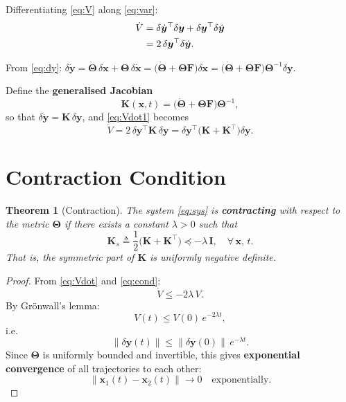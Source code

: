 \documentclass[11pt,a4paper]{article}
\newtheorem{theorem}{Theorem}
\begin{document}
Differentiating \eqref{eq:V} along \eqref{eq:var}:
\begin{align}
  \dot V
  &= \delta\dot{\bm{y}}^\top\delta\bm{y}
   + \delta\bm{y}^\top\delta\dot{\bm{y}} \notag\\
  &= 2\,\delta\bm{y}^\top\delta\dot{\bm{y}}. \label{eq:Vdot1}
\end{align}

From \eqref{eq:dy}: $\delta\dot{\bm{y}} = \dot{\bm{\Theta}}\,\delta\bm{x}
+ \bm{\Theta}\,\delta\dot{\bm{x}}
= \bigl(\dot{\bm{\Theta}} + \bm{\Theta}\bm{F}\bigr)\delta\bm{x}
= \bigl(\dot{\bm{\Theta}} + \bm{\Theta}\bm{F}\bigr)\bm{\Theta}^{-1}\delta\bm{y}.$

Define the \textbf{generalised Jacobian}
\begin{equation}
  \bm{K}(\bm{x},t)
  = \bigl(\dot{\bm{\Theta}} + \bm{\Theta}\bm{F}\bigr)\bm{\Theta}^{-1},
  \label{eq:K}
\end{equation}
so that $\delta\dot{\bm{y}} = \bm{K}\,\delta\bm{y}$, and \eqref{eq:Vdot1}
becomes
\begin{equation}
  \boxed{
  \dot V = 2\,\delta\bm{y}^\top \bm{K}\,\delta\bm{y}
         = \delta\bm{y}^\top\bigl(\bm{K} + \bm{K}^\top\bigr)\delta\bm{y}.
  }
  \label{eq:Vdot}
\end{equation}

\section{Contraction Condition}

\begin{theorem}[Contraction]
The system \eqref{eq:sys} is \textbf{contracting} with respect to the metric
$\bm{\Theta}$ if there exists a constant $\lambda > 0$ such that
\begin{equation}
  \bm{K}_s \triangleq \frac{1}{2}\bigl(\bm{K} + \bm{K}^\top\bigr)
  \preceq -\lambda\,\bm{I}, \quad \forall\,\bm{x},\,t.
  \label{eq:cond}
\end{equation}
That is, the \emph{symmetric part} of $\bm{K}$ is uniformly negative definite.
\end{theorem}

\begin{proof}
From \eqref{eq:Vdot} and \eqref{eq:cond}:
\[
  \dot V \leq -2\lambda\,V.
\]
By Gr\"{o}nwall's lemma:
\[
  V(t) \leq V(0)\,e^{-2\lambda t},
\]
i.e.\
\begin{equation}
  \|\delta\bm{y}(t)\| \leq \|\delta\bm{y}(0)\|\,e^{-\lambda t}.
\end{equation}
Since $\bm{\Theta}$ is uniformly bounded and invertible, this gives
\textbf{exponential convergence} of all trajectories to each other:
\[
  \|\bm{x}_1(t) - \bm{x}_2(t)\| \to 0 \quad \text{exponentially}.
\]
\end{proof}
\end{document}
